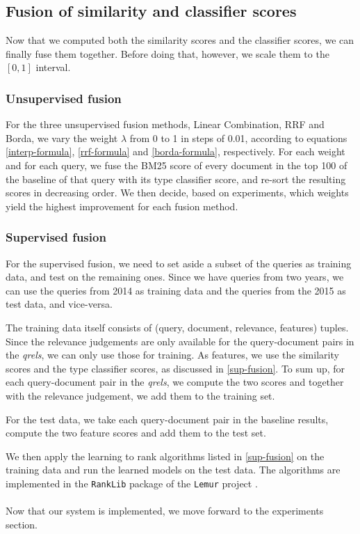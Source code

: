 \subsection{Fusion of similarity and classifier scores}
Now that we computed both the similarity scores and the classifier scores, we can finally fuse them together.
Before doing that, however, we scale them to the $[0,1]$ interval.

\subsubsection{Unsupervised fusion}\label{impl-unsup}
For the three unsupervised fusion methods, Linear Combination, RRF and Borda, we vary the weight $\lambda$ from 0 to 1 in steps of 0.01,
according to equations \ref{interp-formula}, \ref{rrf-formula} and \ref{borda-formula}, respectively. 
For each weight and for each query, we fuse the BM25
score of every document in the top 100 of the baseline of that query with its type classifier score, 
and re-sort the resulting scores in decreasing order.
We then decide, based on experiments, which weights yield the highest improvement for each fusion method.

\subsubsection{Supervised fusion}
For the supervised fusion, we need to set aside a subset of the queries as training data, and test on the remaining ones.
Since we have queries from two years, we can use the queries from 2014 as training data and the queries from
the 2015 as test data, and vice-versa.

The training data itself consists of (query, document, relevance, features) tuples. Since the relevance judgements are only available
for the query-document pairs in the \emph{qrels}, we can only use those for training. As features, we use the 
similarity scores and the type classifier scores, as discussed in \ref{sup-fusion}. To sum up, for each
query-document pair in the \emph{qrels}, we compute the two scores and together with the relevance judgement, we add them
to the training set.

For the test data, we take each query-document pair in the baseline results, compute the two feature scores and add them
to the test set.

We then apply the learning to rank algorithms listed in \ref{sup-fusion} on the training data and run the learned models on the test data.
The algorithms are implemented in the \texttt{RankLib} package of the \texttt{Lemur} project \cite{ranklib}.
\\
\\
Now that our system is implemented, we move forward to the experiments section.




